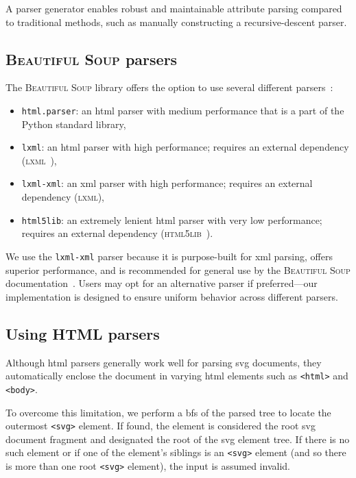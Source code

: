 A parser generator enables robust and maintainable attribute parsing compared to traditional methods, such as manually constructing a recursive-descent parser.

\subsection{\textsc{Beautiful Soup} parsers}

The \textsc{Beautiful Soup} library offers the option to use several different parsers~\cite{beautifulsoup4}:

\begin{itemize}
    \item \texttt{html.parser}: an \gls{html} parser with medium performance that is a part of the Python standard library,
    \item \texttt{lxml}: an \gls{html} parser with high performance; requires an external dependency (\textsc{lxml}~\cite{lxml}),
    \item \texttt{lxml-xml}: an \gls{xml} parser with high performance; requires an external dependency (\textsc{lxml}),
    \item \texttt{html5lib}: an extremely lenient \gls{html} parser with very low performance; requires an external dependency (\textsc{html5lib}~\cite{html5lib}).
\end{itemize}

We use the \texttt{lxml-xml} parser because it is purpose-built for \gls{xml} parsing, offers superior performance, and is recommended for general use by the \textsc{Beautiful Soup} documentation~\cite{beautifulsoup4}. Users may opt for an alternative parser if preferred---our implementation is designed to ensure uniform behavior across different parsers.

\subsection{Using HTML parsers}

Although \gls{html} parsers generally work well for parsing \gls{svg} documents, they automatically enclose the document in varying \gls{html} elements such as \texttt{<html>} and \texttt{<body>}. 

To overcome this limitation, we perform a \gls{bfs} of the parsed tree to locate the outermost \texttt{<svg>} element. If found, the element is considered the root \gls{svg} document fragment and designated the root of the \gls{svg} element tree. If there is no such element or if one of the element's siblings is an \texttt{<svg>} element (and so there is more than one root \texttt{<svg>} element), the input is assumed invalid.

